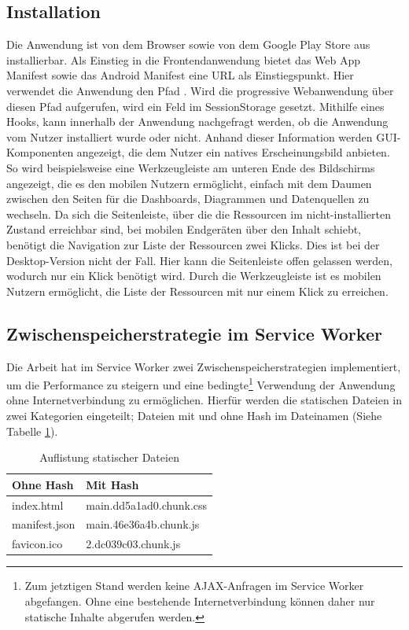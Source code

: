 \subsection{Installation}
\label{subec:installation}
Die Anwendung ist von dem Browser sowie von dem Google Play Store aus installierbar. Als Einstieg
in die Frontendanwendung bietet das Web App Manifest sowie das Android Manifest eine URL als Einstiegspunkt.
Hier verwendet die Anwendung den Pfad . Wird die progressive Webanwendung über diesen Pfad
aufgerufen, wird ein Feld im SessionStorage gesetzt. Mithilfe eines  Hooks, kann innerhalb
der Anwendung nachgefragt werden, ob die Anwendung vom Nutzer installiert wurde oder nicht. Anhand dieser
Information werden GUI-Komponenten angezeigt, die dem Nutzer ein natives Erscheinungsbild anbieten. So wird beispielsweise
eine Werkzeugleiste am unteren Ende des Bildschirms angezeigt, die es den mobilen Nutzern ermöglicht,
einfach mit dem Daumen zwischen den Seiten für die Dashboards, Diagrammen und Datenquellen zu wechseln.
Da sich die Seitenleiste, über die die Ressourcen im nicht-installierten Zustand erreichbar sind, bei mobilen
Endgeräten über den Inhalt schiebt, benötigt die Navigation zur Liste der Ressourcen zwei Klicks. Dies ist
bei der Desktop-Version nicht der Fall. Hier kann die Seitenleiste offen gelassen werden, wodurch nur ein Klick
benötigt wird. Durch die Werkzeugleiste ist es mobilen Nutzern ermöglicht, die Liste der Ressourcen mit nur einem
Klick zu erreichen.


\subsection{Zwischenspeicherstrategie im Service Worker}
\label{subsec:zwischenspeicherstrategieimserviceworker}
Die Arbeit hat im Service Worker zwei Zwischenspeicherstrategien implementiert,
um die Performance zu steigern und eine bedingte\footnote{Zum jetztigen Stand
werden keine AJAX-Anfragen im Service Worker abgefangen. Ohne eine bestehende Internetverbindung
können daher nur statische Inhalte abgerufen werden.}
Verwendung der Anwendung ohne Internetverbindung zu ermöglichen. Hierfür werden die statischen Dateien in zwei
Kategorien eingeteilt; Dateien mit und ohne Hash im Dateinamen (Siehe Tabelle \ref{tab:auflistungstatischerdateien}).

\begin{table}[h]
\begin{center}
\begin{tabular}{ll}
Ohne Hash & Mit Hash\\
\hline
index.html & main.dd5a1ad0.chunk.css\\
manifest.json & main.46e36a4b.chunk.js\\
favicon.ico & 2.dc039c03.chunk.js\\
\end{tabular}
\end{center}
\caption{Auflistung statischer Dateien}
\label{tab:auflistungstatischerdateien}
\end{table}

